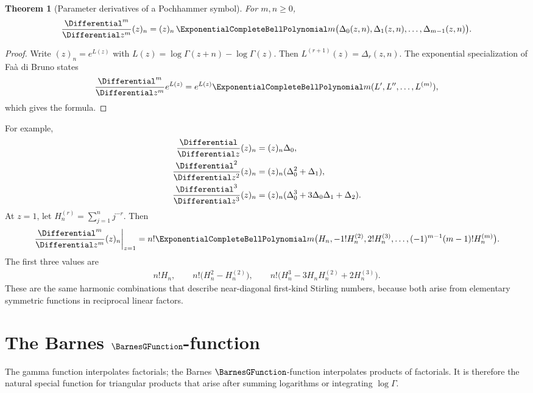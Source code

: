 \documentclass[11pt,a4paper,oneside,openany]{book}
\newtheorem{theorem}{Theorem}[chapter]
\theoremstyle{definition}
\theoremstyle{remark}
\begin{document}
\begin{theorem}[Parameter derivatives of a Pochhammer symbol]
For $m,n\ge0$,
\begin{equation}
 \frac{\Differential^m}{\Differential z^m}(z)_n
 =(z)_n\,
 \ExponentialCompleteBellPolynomial m\bigl(\Delta_0(z,n),\Delta_1(z,n),\ldots,
                    \Delta_{m-1}(z,n)\bigr).
 \label{new:eq:pochhammer-derivative}
\end{equation}
\end{theorem}

\begin{proof}
Write $(z)_n=e^{L(z)}$ with
$L(z)=\log\Gamma(z+n)-\log\Gamma(z)$.  Then
$L^{(r+1)}(z)=\Delta_r(z,n)$.  The exponential specialization of Fa\`a di
Bruno states
\[
 \frac{\Differential^m}{\Differential z^m}e^{L(z)}
 =e^{L(z)}\ExponentialCompleteBellPolynomial m(L',L'',\ldots,L^{(m)}),
\]
which gives the formula.
\end{proof}

For example,
\begin{align*}
 \frac{\Differential}{\Differential z}(z)_n
 &=(z)_n\Delta_0,\\
 \frac{\Differential^2}{\Differential z^2}(z)_n
 &=(z)_n(\Delta_0^2+\Delta_1),\\
 \frac{\Differential^3}{\Differential z^3}(z)_n
 &=(z)_n(\Delta_0^3+3\Delta_0\Delta_1+\Delta_2).
\end{align*}
At $z=1$, let $H_n^{(r)}=\sum_{j=1}^n j^{-r}$.  Then
\begin{equation}
 \left.\frac{\Differential^m}{\Differential z^m}(z)_n\right|_{z=1}
 =n!\ExponentialCompleteBellPolynomial m\bigl(H_n,-1!H_n^{(2)},2!H_n^{(3)},\ldots,
                  (-1)^{m-1}(m-1)!H_n^{(m)}\bigr).
 \label{new:eq:pochhammer-harmonic}
\end{equation}
The first three values are
\begin{align*}
 n!H_n,\qquad
 n!\bigl(H_n^2-H_n^{(2)}\bigr),\qquad
 n!\bigl(H_n^3-3H_nH_n^{(2)}+2H_n^{(3)}\bigr).
\end{align*}
These are the same harmonic combinations that describe near-diagonal
first-kind Stirling numbers, because both arise from elementary symmetric
functions in reciprocal linear factors.

\chapter{The Barnes \texorpdfstring{$\BarnesGFunction$}{G}-function}
\label{ch:barnes-g}

The gamma function interpolates factorials; the Barnes $\BarnesGFunction$-function interpolates
products of factorials.  It is therefore the natural special function for
triangular products that arise after summing logarithms or integrating
$\log\Gamma$.
\end{document}
